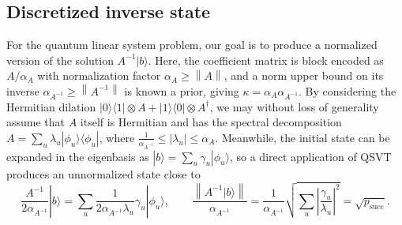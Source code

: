 \documentclass[letterpaper,onecolumn,11pt,accepted=2026-02-14]{quantumarticle}
\newcommand{\abs}[1]{\left\lvert#1\right\rvert}
\newcommand{\norm}[1]{\left\lVert#1\right\rVert}
\theoremstyle{remark}
\theoremstyle{plain}
\newcommand{\ket}[1]{|#1\rangle}
\newcommand{\bra}[1]{\langle#1|}
\newcommand{\ketbra}[2]{\ket{#1}\!\bra{#2}}
\begin{document}
\subsection{Discretized inverse state}
\label{sec:intro_dinv}
For the quantum linear system problem, our goal is to produce a normalized version of the solution $A^{-1}\ket{b}$.
Here, the coefficient matrix is block encoded as $A/\alpha_A$ with normalization factor $\alpha_A\geq\norm{A}$, and a norm upper bound on its inverse $\alpha_{A^{-1}}\geq\norm{A^{-1}}$ is known a prior, giving $\kappa=\alpha_A\alpha_{A^{-1}}$. 
By considering the Hermitian dilation $\ketbra{0}{1}\otimes A+\ketbra{1}{0}\otimes A^\dagger$, we may without loss of generality assume that $A$ itself is Hermitian and has the spectral decomposition $A=\sum_u\lambda_u\ketbra{\phi_u}{\phi_u}$, where $\frac{1}{\alpha_{A^{-1}}}\leq\abs{\lambda_u}\leq\alpha_A$. Meanwhile, the initial state can be expanded in the eigenbasis as $\ket{b}=\sum_u\gamma_u\ket{\phi_u}$, so a direct application of QSVT produces an unnormalized state close to
\begin{equation}
    \frac{A^{-1}}{2\alpha_{A^{-1}}}\ket{b}
    =\sum_u\frac{1}{2\alpha_{A^{-1}}\lambda_u}\gamma_u\ket{\phi_u},\qquad
    \frac{\norm{A^{-1}\ket{b}}}{\alpha_{A^{-1}}}
    =\frac{1}{\alpha_{A^{-1}}}\sqrt{\sum_u\abs{\frac{\gamma_u}{\lambda_u}}^2}
    =\sqrt{p_{\text{succ}}}.
\end{equation}
\end{document}

